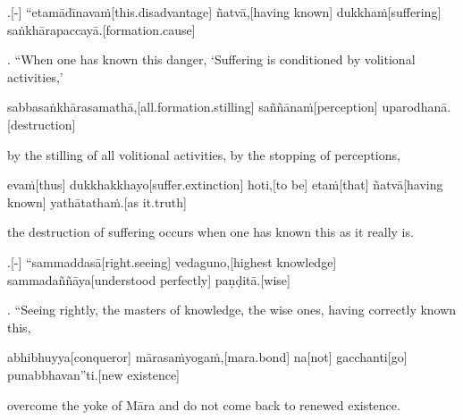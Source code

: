 \begin{samepage}
.[-] “etamādīnavaṁ[this.disadvantage] ñatvā,[having known] dukkhaṁ[suffering] saṅkhārapaccayā.[formation.cause]
\endgl
\nopagebreak
\linespread{0.5}
\begin{spacin}{0.2}
{. “When one has known this danger, ‘Suffering is conditioned by volitional activities,’}
\end{spacin}
\vskip 12pt
\end{samepage}
\begin{samepage}
\begingl[glneveryline={\PaliGlossA,\PaliGlossB}]
sabbasaṅkhārasamathā,[all.formation.stilling] saññānaṁ[perception] uparodhanā.[destruction]
\endgl
\nopagebreak
\linespread{0.5}
\begin{spacin}{0.2}
{\PaliGlossFT by the stilling of all volitional activities,  by the stopping of perceptions,}
\end{spacin}
\vskip 12pt
\end{samepage}
\begin{samepage}
\begingl[glneveryline={\PaliGlossA,\PaliGlossB}]
evaṁ[thus] dukkhakkhayo[suffer.extinction] hoti,[to be] etaṁ[that] ñatvā[having known] yathātathaṁ.[as it.truth]
\endgl
\nopagebreak
\linespread{0.5}
\begin{spacin}{0.2}
{\PaliGlossFT the destruction of suffering occurs when one has known this as it really is.}
\end{spacin}
\vskip 12pt
\end{samepage}
\begin{samepage}
.[-] “sammaddasā[right.seeing] vedaguno,[highest knowledge] sammadaññāya[understood perfectly] paṇḍitā.[wise]
\endgl
\nopagebreak
\linespread{0.5}
\begin{spacin}{0.2}
{. “Seeing rightly, the masters of knowledge, the wise ones, having correctly known this,}
\end{spacin}
\vskip 12pt
\end{samepage}
\begin{samepage}
\begingl[glneveryline={\PaliGlossA,\PaliGlossB}]
abhibhuyya[conqueror] mārasaṁyogaṁ,[mara.bond] na[not] gacchanti[go] punabbhavan”ti.[new existence]
\endgl
\nopagebreak
\linespread{0.5}
\begin{spacin}{0.2}
{\PaliGlossFT overcome the yoke of Māra  and do not come back to renewed existence.}
\end{spacin}
\vskip 12pt
\end{samepage}
